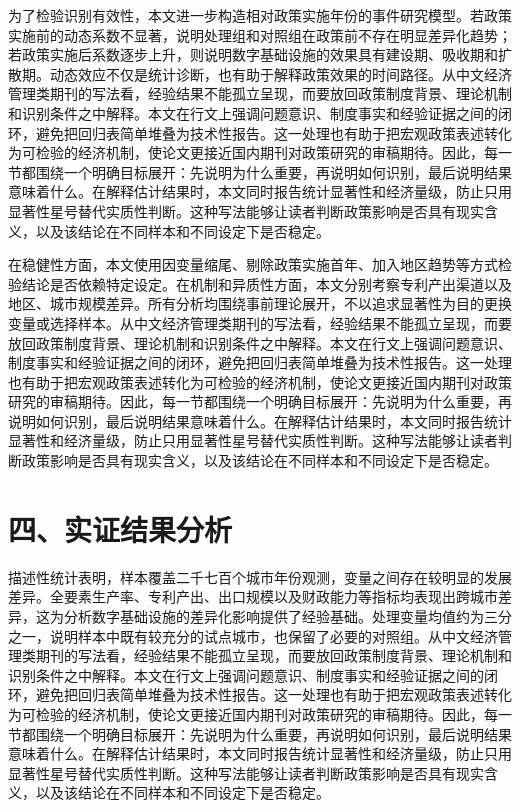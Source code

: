 \documentclass[12pt,a4paper]{article}
\begin{document}
为了检验识别有效性，本文进一步构造相对政策实施年份的事件研究模型。若政策实施前的动态系数不显著，说明处理组和对照组在政策前不存在明显差异化趋势；若政策实施后系数逐步上升，则说明数字基础设施的效果具有建设期、吸收期和扩散期。动态效应不仅是统计诊断，也有助于解释政策效果的时间路径。从中文经济管理类期刊的写法看，经验结果不能孤立呈现，而要放回政策制度背景、理论机制和识别条件之中解释。本文在行文上强调问题意识、制度事实和经验证据之间的闭环，避免把回归表简单堆叠为技术性报告。这一处理也有助于把宏观政策表述转化为可检验的经济机制，使论文更接近国内期刊对政策研究的审稿期待。因此，每一节都围绕一个明确目标展开：先说明为什么重要，再说明如何识别，最后说明结果意味着什么。在解释估计结果时，本文同时报告统计显著性和经济量级，防止只用显著性星号替代实质性判断。这种写法能够让读者判断政策影响是否具有现实含义，以及该结论在不同样本和不同设定下是否稳定。

在稳健性方面，本文使用因变量缩尾、剔除政策实施首年、加入地区趋势等方式检验结论是否依赖特定设定。在机制和异质性方面，本文分别考察专利产出渠道以及地区、城市规模差异。所有分析均围绕事前理论展开，不以追求显著性为目的更换变量或选择样本。从中文经济管理类期刊的写法看，经验结果不能孤立呈现，而要放回政策制度背景、理论机制和识别条件之中解释。本文在行文上强调问题意识、制度事实和经验证据之间的闭环，避免把回归表简单堆叠为技术性报告。这一处理也有助于把宏观政策表述转化为可检验的经济机制，使论文更接近国内期刊对政策研究的审稿期待。因此，每一节都围绕一个明确目标展开：先说明为什么重要，再说明如何识别，最后说明结果意味着什么。在解释估计结果时，本文同时报告统计显著性和经济量级，防止只用显著性星号替代实质性判断。这种写法能够让读者判断政策影响是否具有现实含义，以及该结论在不同样本和不同设定下是否稳定。

\section*{四、实证结果分析}
描述性统计表明，样本覆盖二千七百个城市年份观测，变量之间存在较明显的发展差异。全要素生产率、专利产出、出口规模以及财政能力等指标均表现出跨城市差异，这为分析数字基础设施的差异化影响提供了经验基础。处理变量均值约为三分之一，说明样本中既有较充分的试点城市，也保留了必要的对照组。从中文经济管理类期刊的写法看，经验结果不能孤立呈现，而要放回政策制度背景、理论机制和识别条件之中解释。本文在行文上强调问题意识、制度事实和经验证据之间的闭环，避免把回归表简单堆叠为技术性报告。这一处理也有助于把宏观政策表述转化为可检验的经济机制，使论文更接近国内期刊对政策研究的审稿期待。因此，每一节都围绕一个明确目标展开：先说明为什么重要，再说明如何识别，最后说明结果意味着什么。在解释估计结果时，本文同时报告统计显著性和经济量级，防止只用显著性星号替代实质性判断。这种写法能够让读者判断政策影响是否具有现实含义，以及该结论在不同样本和不同设定下是否稳定。
\end{document}
